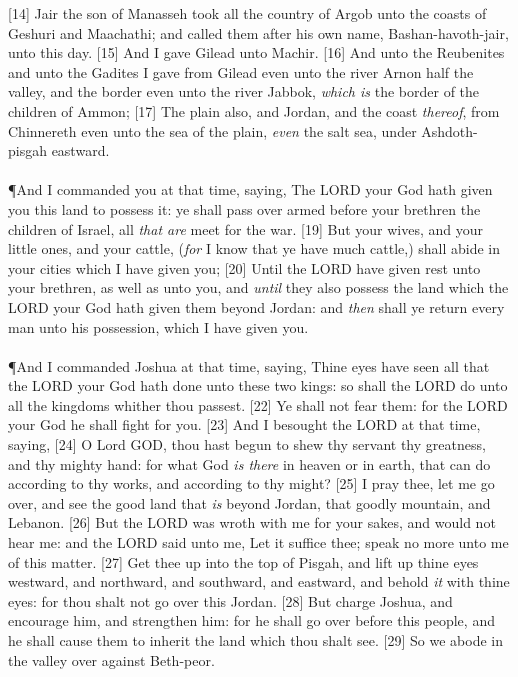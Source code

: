 [14] \textcolor[rgb]{0.00,0.00,1.00}{Jair the son of Manasseh took all the country of Argob unto the coasts of Geshuri and Maachathi; and called them after his own name, Bashan-havoth-jair, unto this day.}
[15] \textcolor[rgb]{0.00,0.00,1.00}{And I gave Gilead unto Machir.}
[16] \textcolor[rgb]{0.00,0.00,1.00}{And unto the Reubenites and unto the Gadites I gave from Gilead even unto the river Arnon half the valley, and the border even unto the river Jabbok, \emph{which is} the border of the children of Ammon;}
[17] \textcolor[rgb]{0.00,0.00,1.00}{The plain also, and Jordan, and the coast \emph{thereof}, from Chinnereth even unto the sea of the plain, \emph{even} the salt sea, under Ashdoth-pisgah eastward.}\\
\\
\P \textcolor[rgb]{0.00,0.00,1.00}{And I commanded you at that time, saying, The LORD your God hath given you this land to possess it: ye shall pass over armed before your brethren the children of Israel, all \emph{that are} meet for the war.}
[19] \textcolor[rgb]{0.00,0.00,1.00}{But your wives, and your little ones, and your cattle, (\emph{for} I know that ye have much cattle,) shall abide in your cities which I have given you;}
[20] \textcolor[rgb]{0.00,0.00,1.00}{Until the LORD have given rest unto your brethren, as well as unto you, and \emph{until} they also possess the land which the LORD your God hath given them beyond Jordan: and \emph{then} shall ye return every man unto his possession, which I have given you.}\\
\\
\P \textcolor[rgb]{0.00,0.00,1.00}{And I commanded Joshua at that time, saying, Thine eyes have seen all that the LORD your God hath done unto these two kings: so shall the LORD do unto all the kingdoms whither thou passest.}
[22] \textcolor[rgb]{0.00,0.00,1.00}{Ye shall not fear them: for the LORD your God he shall fight for you.}
[23] \textcolor[rgb]{0.00,0.00,1.00}{And I besought the LORD at that time, saying,}
[24] \textcolor[rgb]{0.00,0.00,1.00}{O Lord GOD, thou hast begun to shew thy servant thy greatness, and thy mighty hand: for what God \emph{is there} in heaven or in earth, that can do according to thy works, and according to thy might?}
[25] \textcolor[rgb]{0.00,0.00,1.00}{I pray thee, let me go over, and see the good land that \emph{is} beyond Jordan, that goodly mountain, and Lebanon.}
[26] \textcolor[rgb]{0.00,0.00,1.00}{But the LORD was wroth with me for your sakes, and would not hear me: and the LORD said unto me, Let it suffice thee; speak no more unto me of this matter.}
[27] \textcolor[rgb]{0.00,0.00,1.00}{Get thee up into the top of Pisgah, and lift up thine eyes westward, and northward, and southward, and eastward, and behold \emph{it} with thine eyes: for thou shalt not go over this Jordan.}
[28] \textcolor[rgb]{0.00,0.00,1.00}{But charge Joshua, and encourage him, and strengthen him: for he shall go over before this people, and he shall cause them to inherit the land which thou shalt see.}
[29] \textcolor[rgb]{0.00,0.00,1.00}{So we abode in the valley over against Beth-peor.}
\newpage
